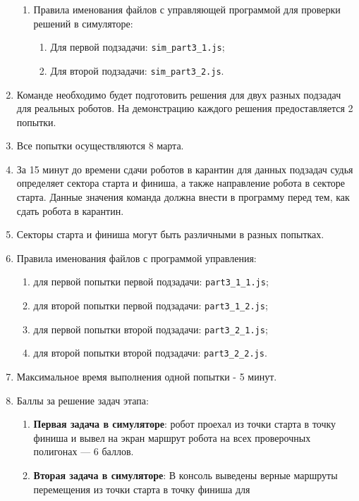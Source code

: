 \begin{enumerate}
\begin{enumerate}
        \item Правила именования файлов с управляющей программой для проверки решений в симуляторе:
        \begin{enumerate}
            \item Для первой подзадачи: \texttt{sim\_part3\_1.js};
            \item Для второй подзадачи: \texttt{sim\_part3\_2.js}.
        \end{enumerate}

    \end{enumerate}
    \item Команде необходимо будет подготовить решения для двух разных подзадач для реальных роботов. На демонстрацию каждого решения предоставляется 2 попытки.
    \item Все попытки осуществляются 8 марта.
    \item За 15 минут до времени сдачи роботов в карантин для данных подзадач судья определяет сектора старта и финиша, а также направление робота в секторе старта.
            Данные значения команда должна внести в программу перед тем, как сдать робота в карантин.
    \item Секторы старта и финиша могут быть различными в разных попытках.
    \item Правила именования файлов с программой управления:
    \begin{enumerate}
        \item для первой попытки первой подзадачи: \texttt{part3\_1\_1.js};
        \item для второй попытки первой подзадачи: \texttt{part3\_1\_2.js};
        \item для первой попытки второй подзадачи: \texttt{part3\_2\_1.js};
        \item для второй попытки второй подзадачи: \texttt{part3\_2\_2.js}.
    \end{enumerate}
    \item Максимальное время выполнения одной попытки - 5 минут.
    \item Баллы за решение задач этапа:
    \begin{enumerate}
        \item \textbf{Первая задача в симуляторе}: робот проехал из точки старта в точку финиша и вывел на экран маршрут робота
                на всех проверочных полигонах --- 6 баллов.
        \item \textbf{Вторая задача в симуляторе}: В консоль выведены верные маршруты перемещения из точки старта в точку финиша для

\end{enumerate}
\end{enumerate}
